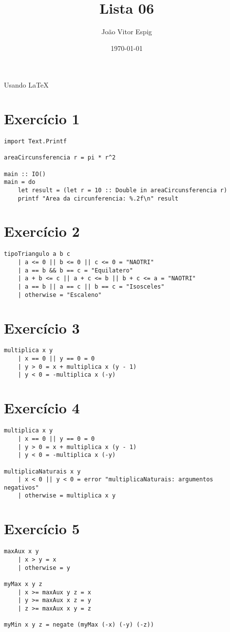 \documentclass[12pt,a4paper,brazil]{article}
\title{Lista 06}
\author{João Vitor Espig}
\date{\today}
\begin{document}
\maketitle
Usando \LaTeX

\section*{Exercício 1}
\begin{lstlisting}
import Text.Printf

areaCircunsferencia r = pi * r^2

main :: IO()
main = do
    let result = (let r = 10 :: Double in areaCircunsferencia r)
    printf "Area da circunferencia: %.2f\n" result
\end{lstlisting}

\section*{Exercício 2}
\begin{lstlisting}
tipoTriangulo a b c
    | a <= 0 || b <= 0 || c <= 0 = "NAOTRI"
    | a == b && b == c = "Equilatero"
    | a + b <= c || a + c <= b || b + c <= a = "NAOTRI"
    | a == b || a == c || b == c = "Isosceles"
    | otherwise = "Escaleno"
\end{lstlisting}

\section*{Exercício 3}
\begin{lstlisting}
multiplica x y
    | x == 0 || y == 0 = 0
    | y > 0 = x + multiplica x (y - 1)
    | y < 0 = -multiplica x (-y)
\end{lstlisting}

\section*{Exercício 4}
\begin{lstlisting}
multiplica x y
    | x == 0 || y == 0 = 0
    | y > 0 = x + multiplica x (y - 1)
    | y < 0 = -multiplica x (-y)

multiplicaNaturais x y
    | x < 0 || y < 0 = error "multiplicaNaturais: argumentos negativos"
    | otherwise = multiplica x y
\end{lstlisting}

\section*{Exercício 5}
\begin{lstlisting}
maxAux x y
    | x > y = x
    | otherwise = y

myMax x y z
    | x >= maxAux y z = x
    | y >= maxAux x z = y
    | z >= maxAux x y = z

myMin x y z = negate (myMax (-x) (-y) (-z))
\end{lstlisting}
\end{document}

